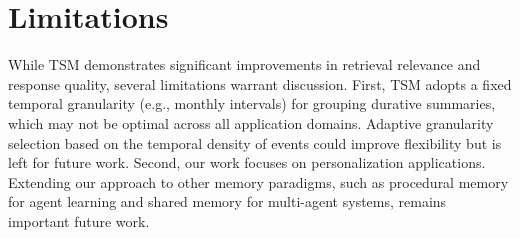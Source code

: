 \documentclass[11pt]{article}
\newcommand{\ours}[1]{TSM}
\begin{document}
\section*{Limitations}
While \ours{} demonstrates significant improvements in retrieval relevance and response quality, several limitations warrant discussion. 
First, %
\ours{} adopts a fixed temporal granularity (e.g., monthly intervals) for grouping durative summaries, which may not be optimal across all application domains. Adaptive granularity selection based on the temporal density of events could improve flexibility but is left for future work.
Second, our work focuses on personalization applications. Extending our approach to other memory paradigms, such as procedural memory for agent learning and shared memory for multi-agent systems, remains important future work.




%

\end{document}
